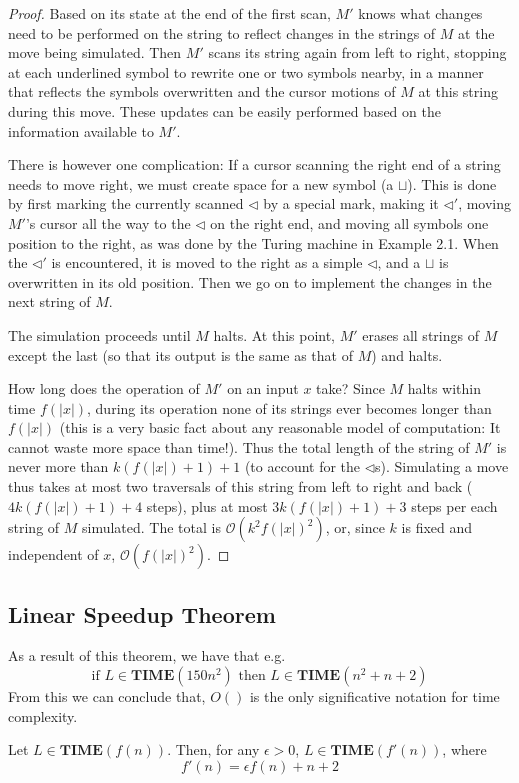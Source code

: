\documentclass[12pt]{article}
\begin{document}
\begin{proof}
  Based on its state at the end of the first scan, $M'$ knows what changes need to be performed on the string to reflect changes in the strings of $M$ at the move being simulated. Then $M'$ scans its string again from left to right, stopping at each underlined symbol to rewrite one or two symbols nearby, in a manner that reflects the symbols overwritten and the cursor motions of $M$ at this string during this move. These updates can be easily performed based on the information available to $M'$.

  There is however one complication: If a cursor scanning the right end of a string needs to move right, we must create space for a new symbol (a $\sqcup$). This is done by first marking the currently scanned $\lhd$ by a special mark, making it $\lhd'$, moving $M'$'s cursor all the way to the $\lhd$ on the right end, and moving all symbols one position to the right, as was done by the Turing machine in Example 2.1. When the $\lhd'$ is encountered, it is moved to the right as a simple $\lhd$, and a $\sqcup$ is overwritten in its old position. Then we go on to implement the changes in the next string of $M$.
  
  The simulation proceeds until $M$ halts. At this point, $M'$ erases all strings of $M$ except the last (so that its output is the same as that of $M$) and halts.
  
  How long does the operation of $M'$ on an input $x$ take? Since $M$ halts within time $f(|x|)$, during its operation none of its strings ever becomes longer than $f(|x|)$ (this is a very basic fact about any reasonable model of computation: It cannot waste more space than time!). Thus the total length of the string of $M'$ is never more than $k(f(|x|) + 1) + 1$ (to account for the $\lhd$s). Simulating a move thus takes at most two traversals of this string from left to right and back ($4k(f(|x|) + 1) + 4$ steps), plus at most $3k(f(|x|) + 1) + 3$ steps per each string of $M$ simulated. The total is $\mathcal{O}(k^2 f(|x|)^2)$, or, since $k$ is fixed and independent of $x$, $\mathcal{O}(f(|x|)^2)$.
\end{proof}

\subsection{Linear Speedup Theorem}
As a result of this theorem, we have that e.g. 
$$\text{if } L\in\textbf{TIME}(150n^2) \text{ then } L\in\textbf{TIME}(n^2 + n +2)$$  
From this we can conclude that, $O()$ is the only significative notation for time complexity.
\begin{defbox}
  Let $L\in\textbf{TIME}(f(n))$. Then, for any $\epsilon>0$, $L\in\textbf{TIME}(f'(n))$, where $$f'(n) = \epsilon f(n)+n+2$$ 
\end{defbox}
\end{document}
